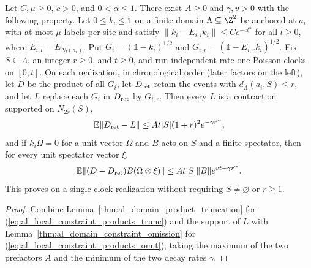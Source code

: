\begin{lemma}
    \label{thm:al_local_constraint_products}
    \leanok
    Let $C,\mu\ge0$, $c>0$, and $0<\alpha\le1$. There exist $A\ge0$ and
    $\gamma,v>0$ with the following property. Let $0\le k_i\le\mathbb 1$ on a
    finite domain $\Lambda\subseteq\Z^2$ be anchored at $a_i$ with at most $\mu$
    labels per site and satisfy $\|k_i-E_{i,l}k_i\|\le Ce^{-cl^\alpha}$ for all
    $l\ge0$, where $E_{i,l}=E_{N_l(a_i)}$. Put $G_i=(\mathbb 1-k_i)^{1/2}$ and
    $G_{i,r}=(\mathbb 1-E_{i,r}k_i)^{1/2}$. Fix $S\subseteq\Lambda$, an integer
    $r\ge0$, and $t\ge0$, and run independent rate-one Poisson clocks on
    $[0,t]$. On each realization, in chronological order (later factors on the
    left), let $D$ be the product of all $G_i$, let $D_{\rm ret}$ retain the
    events with $d_\Lambda(a_i,S)\le r$, and let $L$ replace each $G_i$ in
    $D_{\rm ret}$ by $G_{i,r}$. Then every $L$ is a contraction supported on
    $N_{2r}(S)$,
    \begin{align}
        \mathbb E\|D_{\rm ret}-L\|\le At|S|(1+r)^2e^{-\gamma r^\alpha},
        \label{eq:al_local_constraint_products_trunc}
    \end{align}
    and if $k_i\Omega=0$ for a unit vector $\Omega$ and $B$ acts on $S$ and a
    finite spectator, then for every unit spectator vector $\xi$,
    \begin{align}
        \mathbb E\|(D-D_{\rm ret})B(\Omega\otimes\xi)\|
        \le At|S|\|B\|e^{vt-\gamma r^\alpha}.
        \label{eq:al_local_constraint_products_omit}
    \end{align}
    This proves \cite[Lemma~10.1]{OpenAI2026AreaLaw} on a single clock
    realization without requiring $S\ne\varnothing$ or $r\ge1$.
\end{lemma}
\begin{proof}\leanok
    Combine Lemma~\ref{thm:al_domain_product_truncation} for
    (\ref{eq:al_local_constraint_products_trunc}) and the support of $L$ with
    Lemma~\ref{thm:al_domain_constraint_omission} for
    (\ref{eq:al_local_constraint_products_omit}), taking the maximum of the two
    prefactors $A$ and the minimum of the two decay rates $\gamma$.
\end{proof}
